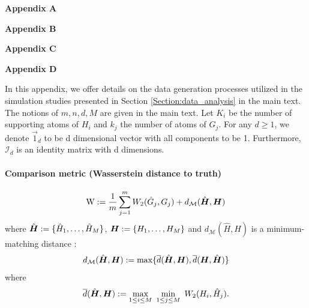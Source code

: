\newpage


\newpage
\begin{center}
\textbf{\Large Appendix A}
\end{center}


\begin{center}
\textbf{\Large Appendix B}
\end{center}


\begin{center}
\textbf{\Large Appendix C}
\end{center}


\begin{center}
\textbf{\Large Appendix D}
\end{center}







In this appendix, we offer details on the data generation processes 
utilized in the simulation studies presented in Section \ref{Section:data_analysis} in the main text. %
The notions of $m, n, d, M$ are given in the main text. 
Let $K_i$ be the number of supporting atoms of $H_i$ and $k_{j}$
the number of atoms of $G_{j}$. For any $d \geq 1$, we denote $\vec{1}_{d}$ to be d dimensional vector with all components to be 1. Furthermore, $\mathcal{I}_{d}$ is an identity matrix with d dimensions. 

\paragraph{Comparison metric (Wasserstein distance to truth)}
\begin{eqnarray}
\text{W}:= \frac{1}{m}\sum_{j=1}^m W_2(\hat G_j, G_j) + d_{\mathcal{M}}(\hat {\boldsymbol{H}}, \boldsymbol{H}) \nonumber
\end{eqnarray}
where $\hat{\boldsymbol{H}} := \{\hat H_1,\ldots,\hat H_M\}$, $\boldsymbol{H} := \{H_1,\ldots,H_M\}$ and $d_{\mathcal{M}}(\hat H, H)$ is a minimum-matching distance \cite{tang2014understanding, Nguyen-2015}:
$$d_{\mathcal{M}}(\hat{\boldsymbol{H}}, \boldsymbol{H}) := \max\{\overline{d}(\hat{\boldsymbol{H}}, \boldsymbol{H}), \overline{d}(\boldsymbol{H}, \hat{\boldsymbol{H}})\}$$
where
$$\overline{d}(\hat{\boldsymbol{H}}, \boldsymbol{H}) := \max\limits_{1 \leq i \leq M}\,\,\min\limits_{1 \leq j \leq M} \,\, W_2(H_{i},\hat H_{j}).$$

